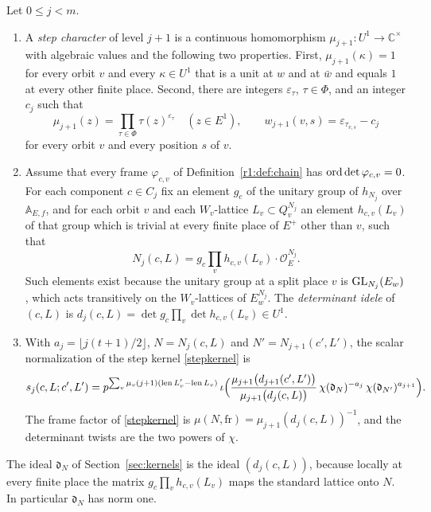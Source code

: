 \begin{definition}\label{a8:def:frame}
Let $0\le j<m$.
\begin{enumerate}
\item[(i)] A \emph{step character} of level $j+1$ is a continuous homomorphism $\mu_{j+1}\colon U^1\to\mathbb C^\times$ with algebraic values and the following two properties. First, $\mu_{j+1}(\kappa)=1$ for every orbit $v$ and every $\kappa\in U^1$ that is a unit at $w$ and at $\bar w$ and equals $1$ at every other finite place. Second, there are integers $\varepsilon_\tau$, $\tau\in\Phi$, and an integer $c_j$ such that
\begin{equation}\label{a8:eq:inftype}
\mu_{j+1}(z)=\prod_{\tau\in\Phi}\tau(z)^{\varepsilon_\tau}\quad(z\in E^1),\qquad w_{j+1}(v,s)=\varepsilon_{\tau_{v,s}}-c_j
\end{equation}
for every orbit $v$ and every position $s$ of $v$.
\item[(ii)] Assume that every frame $\varphi_{c,v}$ of Definition~\ref{r1:def:chain} has $\operatorname{ord}\det\varphi_{c,v}=0$. For each component $c\in C_j$ fix an element $g_c$ of the unitary group of $h_{N_j}$ over $\mathbb A_{E,f}$, and for each orbit $v$ and each $W_v$-lattice $L_v\subset Q_v^{N_j}$ an element $h_{c,v}(L_v)$ of that group which is trivial at every finite place of $E^+$ other than $v$, such that
\[
N_j(c,L)=g_c\prod_vh_{c,v}(L_v)\cdot\mathcal O_E^{N_j}.
\]
Such elements exist because the unitary group at a split place $v$ is $\operatorname{GL}_{N_j}(E_w)$, which acts transitively on the $W_v$-lattices of $E_w^{N_j}$. The \emph{determinant idele} of $(c,L)$ is $d_j(c,L)=\det g_c\prod_v\det h_{c,v}(L_v)\in U^1$.
\item[(iii)] With $a_j=\lfloor j(t+1)/2\rfloor$, $N=N_j(c,L)$ and $N'=N_{j+1}(c',L')$, the scalar normalization of the step kernel \eqref{stepkernel} is
\[
s_j(c,L;c',L')=p^{\sum_v\mu_v(j+1)(\operatorname{len} L'_v-\operatorname{len} L_v)}\,\iota\Big(\frac{\mu_{j+1}\big(d_{j+1}(c',L')\big)}{\mu_{j+1}\big(d_j(c,L)\big)}\,\chi(\mathfrak d_N)^{-a_j}\,\chi(\mathfrak d_{N'})^{a_{j+1}}\Big).
\]
The frame factor of \eqref{stepkernel} is $\mu(N,\mathrm{fr})=\mu_{j+1}(d_j(c,L))^{-1}$, and the determinant twists are the two powers of $\chi$.
\end{enumerate}
\end{definition}

The ideal $\mathfrak d_N$ of Section~\ref{sec:kernels} is the ideal $(d_j(c,L))$, because locally at every finite place the matrix $g_c\prod_vh_{c,v}(L_v)$ maps the standard lattice onto $N$. In particular $\mathfrak d_N$ has norm one.

